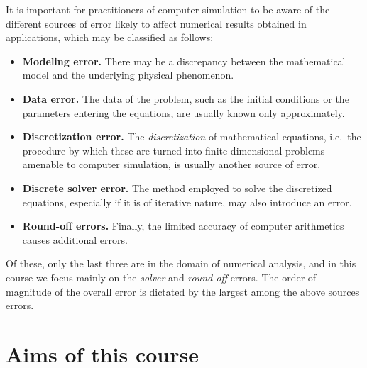 It is important for practitioners of computer simulation to be aware of the different sources of error likely to affect numerical results obtained in applications,
which may be classified as follows:
\begin{itemize}
    \item
        \textbf{Modeling error.}
        There may be a discrepancy between the mathematical model and the underlying physical phenomenon.

    \item
        \textbf{Data error.}
        The data of the problem,
        such as the initial conditions or the parameters entering the equations,
        are usually known only approximately.

    \item
        \textbf{Discretization error.}
        The \emph{discretization} of mathematical equations,
        i.e.\ the procedure by which these are turned into finite-dimensional problems amenable to computer simulation,
        is usually another source of error.

    \item
        \textbf{Discrete solver error.}
        The method employed to solve the discretized equations,
        especially if it is of iterative nature,
        may also introduce an error.

    \item
        \textbf{Round-off errors.}
        Finally, the limited accuracy of computer arithmetics causes additional errors.
\end{itemize}
Of these,
only the last three are in the domain of numerical analysis,
and in this course we focus mainly on the \emph{solver} and \emph{round-off} errors.
The order of magnitude of the overall error is dictated by the largest among the above sources errors.

\section*{Aims of this course}%
\label{sec:goals_of_computer_simulation}

